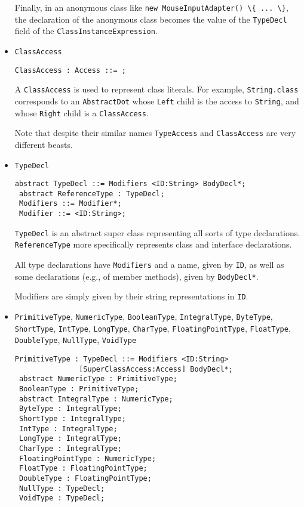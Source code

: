 \documentclass{article}
\newcommand{\nt}[1]{\texttt{#1}}
\newcommand{\child}[1]{\texttt{#1}}
\newcommand{\code}[1]{\lstinline$#1$}
\begin{document}
\begin{itemize}
  Finally, in an anonymous class like \code{new MouseInputAdapter() \{ ... \}},
  the declaration of the anonymous class becomes the value of the
  \child{TypeDecl} field of the \code{ClassInstanceExpression}.

\item \nt{ClassAccess}
  \begin{lstlisting}[frame=single]
 ClassAccess : Access ::= ;
  \end{lstlisting}

  A \nt{ClassAccess} is used to represent class literals. For example,
  \code{String.class} corresponds to an \nt{AbstractDot} whose
  \code{Left} child is the access to \code{String}, and whose \code{Right}
  child is a \nt{ClassAccess}.

  Note that despite their similar names \nt{TypeAccess} and \nt{ClassAccess}
  are very different beasts.

\item \nt{TypeDecl}
  \begin{lstlisting}[frame=single]
 abstract TypeDecl ::= Modifiers <ID:String> BodyDecl*;
 abstract ReferenceType : TypeDecl;
 Modifiers ::= Modifier*;
 Modifier ::= <ID:String>;
  \end{lstlisting}

  \nt{TypeDecl} is an abstract super class representing all sorts of type
  declarations. \nt{ReferenceType} more specifically represents class and
  interface declarations.

  All type declarations have \child{Modifiers} and a name, given by
  \child{ID}, as well as some declarations (e.g., of member methods),
  given by \child{BodyDecl*}.

  Modifiers are simply given by their string representations in
  \child{ID}.

\item \nt{PrimitiveType}, \nt{NumericType}, \nt{BooleanType}, \nt{IntegralType},\linebreak
  \nt{ByteType}, \nt{ShortType}, \nt{IntType}, \nt{LongType}, \nt{CharType},\linebreak
  \nt{FloatingPointType}, \nt{FloatType}, \nt{DoubleType}, \nt{NullType},
  \nt{VoidType}
  \begin{lstlisting}[frame=single]
 PrimitiveType : TypeDecl ::= Modifiers <ID:String> 
               [SuperClassAccess:Access] BodyDecl*;
 abstract NumericType : PrimitiveType;
 BooleanType : PrimitiveType;
 abstract IntegralType : NumericType;
 ByteType : IntegralType;
 ShortType : IntegralType;
 IntType : IntegralType;
 LongType : IntegralType;
 CharType : IntegralType;
 FloatingPointType : NumericType;
 FloatType : FloatingPointType;
 DoubleType : FloatingPointType;
 NullType : TypeDecl;
 VoidType : TypeDecl;
  \end{lstlisting}


\end{itemize}
\end{document}
